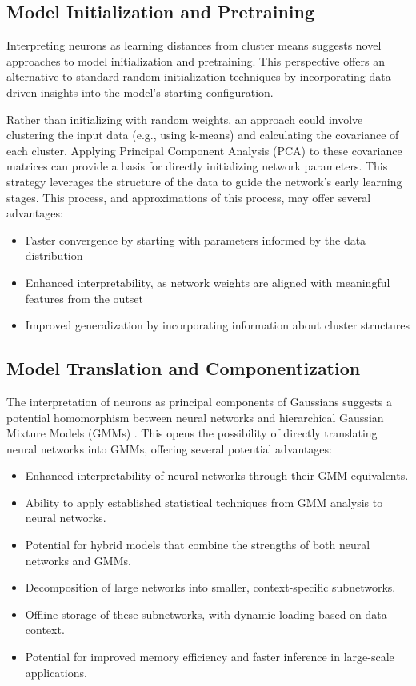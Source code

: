 \subsection{Model Initialization and Pretraining}

Interpreting neurons as learning distances from cluster means suggests novel approaches to model initialization and pretraining. This perspective offers an alternative to standard random initialization techniques \citep{kamilov2017survey} by incorporating data-driven insights into the model's starting configuration.

Rather than initializing with random weights, an approach could involve clustering the input data (e.g., using k-means) and calculating the covariance of each cluster. Applying Principal Component Analysis (PCA) to these covariance matrices can provide a basis for directly initializing network parameters. This strategy leverages the structure of the data to guide the network's early learning stages. This process, and approximations of this process, may offer several advantages:

\begin{itemize} \item Faster convergence by starting with parameters informed by the data distribution \item Enhanced interpretability, as network weights are aligned with meaningful features from the outset \item Improved generalization by incorporating information about cluster structures \end{itemize}

\subsection{Model Translation and Componentization}

The interpretation of neurons as principal components of Gaussians suggests a potential homomorphism between neural networks and hierarchical Gaussian Mixture Models (GMMs) \citep{jacobs1991adaptive}. This opens the possibility of directly translating neural networks into GMMs, offering several potential advantages:

\begin{itemize}
    \item Enhanced interpretability of neural networks through their GMM equivalents. 
    \item Ability to apply established statistical techniques from GMM analysis to neural networks.
    \item Potential for hybrid models that combine the strengths of both neural networks and GMMs.
    \item Decomposition of large networks into smaller, context-specific subnetworks.
    \item Offline storage of these subnetworks, with dynamic loading based on data context.
    \item Potential for improved memory efficiency and faster inference in large-scale applications.
\end{itemize}


